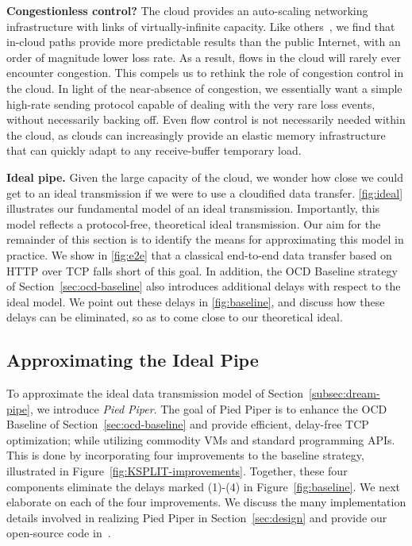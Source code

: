 \documentclass[newfonts=false,format=sigconf,anonymous,10pt,letterpaper]{acmart}
\newcommand{\T}[1]{\smallskip\noindent\textbf{#1}} %
\newcommand{\oursys}{Pied Piper\xspace}
\begin{document}
\T{Congestionless control?} The cloud provides an auto-scaling networking infrastructure with links of virtually-infinite capacity. Like others~\cite{haq2017measuring}, we find that in-cloud paths provide more predictable results than the public Internet, with an order of magnitude lower loss rate. As a result, flows in the cloud will rarely ever encounter congestion. This compels us to rethink the role of congestion control in the cloud. In light of the near-absence of congestion, we essentially want a simple high-rate sending protocol capable of dealing with the very rare loss events, without necessarily backing off. Even flow control is not necessarily needed within the cloud, as clouds can increasingly provide an elastic memory infrastructure~\cite{hotadd,baloon} that can quickly adapt to any receive-buffer temporary load. 

\T{Ideal pipe.} Given the large capacity of the cloud, we wonder how close we could get to an ideal transmission if we were to use a cloudified data transfer.
\autoref{fig:ideal} illustrates our fundamental model of an ideal transmission. Importantly, this model reflects a protocol-free, theoretical ideal transmission. Our aim for the remainder of this section is to identify the means for approximating this model in practice. We show in \autoref{fig:e2e} that a classical end-to-end data transfer based on HTTP over TCP falls short 
of this goal. In addition, the OCD Baseline strategy of Section~\ref{sec:ocd-baseline} also introduces additional delays with respect to the ideal model. We point out these delays in \autoref{fig:baseline}, and discuss how these delays can be eliminated, so as to come close to our theoretical ideal.

\subsection{Approximating the Ideal Pipe}\label{sec:approx}

To approximate the ideal data transmission model of Section~\ref{subsec:dream-pipe}, we introduce \textit{\oursys}.
The goal of \oursys is to enhance the OCD Baseline of Section~\ref{sec:ocd-baseline} and provide efficient, delay-free TCP optimization; while utilizing commodity VMs and standard programming APIs. This is done by incorporating four improvements to the baseline strategy, illustrated in Figure~\ref{fig:KSPLIT-improvements}. Together, these four components eliminate the delays marked (1)-(4) in Figure~\ref{fig:baseline}. We next elaborate on each of the four improvements. We discuss the many implementation details involved in realizing \oursys in Section~\ref{sec:design} and provide our open-source code in~\cite{ktcp}.
\end{document}
